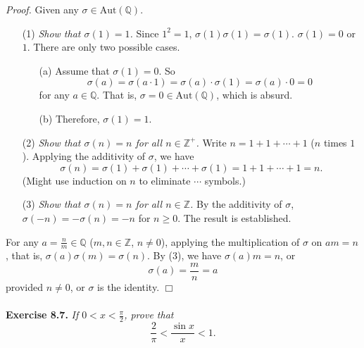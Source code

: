 \documentclass{article}
\begin{document}
\emph{Proof.}
Given any $\sigma \in \text{Aut}(\mathbb{Q})$.
\begin{enumerate}
\item[(1)]
\emph{Show that $\sigma(1) = 1$.}
Since $1^2 = 1$, $\sigma(1)\sigma(1) = \sigma(1)$. $\sigma(1) = 0$ or $1$.
There are only two possible cases.
  \begin{enumerate}
  \item[(a)]
  Assume that $\sigma(1) = 0$. So
  $$\sigma(a) = \sigma(a \cdot 1) = \sigma(a)\cdot \sigma(1) = \sigma(a) \cdot 0 = 0$$
  for any $a \in \mathbb{Q}$.
  That is, $\sigma = 0 \in \text{Aut}(\mathbb{Q})$, which is absurd.
  \item[(b)]
  Therefore, $\sigma(1) = 1$.
  \end{enumerate}
\item[(2)]
\emph{Show that $\sigma(n) = n$ for all $n \in \mathbb{Z}^+$.}
Write $n = 1 + 1 + \cdots + 1$ ($n$ times $1$).
Applying the additivity of $\sigma$, we have
$$\sigma(n) = \sigma(1) + \sigma(1) + \cdots + \sigma(1) = 1 + 1 + \cdots + 1 = n.$$
(Might use induction on $n$ to eliminate $\cdots$ symbols.)
\item[(3)]
\emph{Show that $\sigma(n) = n$ for all $n \in \mathbb{Z}$.}
By the additivity of $\sigma$, $\sigma(-n) = -\sigma(n) = -n$ for $n \geq 0$.
The result is established.
\end{enumerate}
For any $a = \frac{n}{m} \in \mathbb{Q}$ ($m, n \in \mathbb{Z}$, $n \neq 0$),
applying the multiplication of $\sigma$ on $am = n$,
that is,
$\sigma(a) \sigma(m) = \sigma(n)$. By (3), we have $\sigma(a)m = n$,
or $$\sigma(a) = \frac{m}{n} = a$$
provided $n \neq 0$,
or $\sigma$ is the identity.
$\Box$ \\\\






\textbf{Exercise 8.7.}
\emph{If $0 < x < \frac{\pi}{2}$, prove that
\[
  \frac{2}{\pi} < \frac{\sin x}{x} < 1.
\]} \\
\end{document}
